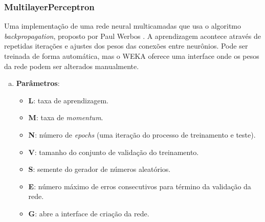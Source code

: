 \subsubsection{MultilayerPerceptron}

Uma implementação de uma rede neural multicamadas que usa o algoritmo \emph{backpropagation}, proposto por Paul Werbos \cite{Werbos1974}. A aprendizagem acontece através de repetidas iterações e ajustes dos pesos das conexões entre neurônios. Pode ser treinada de forma automática, mas o WEKA oferece uma interface onde os pesos da rede podem ser alterados manualmente.

\begin{enumerate}[a)]
    \item \textbf{Parâmetros}:
        \begin{itemize}

            \item \textbf{L}: taxa de aprendizagem.

            \item \textbf{M}: taxa de \emph{momentum}.

            \item \textbf{N}: número de \emph{epochs} (uma iteração do processo de treinamento e teste).

            \item \textbf{V}: tamanho do conjunto de validação do treinamento.

            \item \textbf{S}: semente do gerador de números aleatórios.

            \item \textbf{E}: número máximo de erros consecutivos para término da validação da rede.

            \item \textbf{G}: abre a interface de criação da rede.

\end{itemize}
\end{enumerate}
